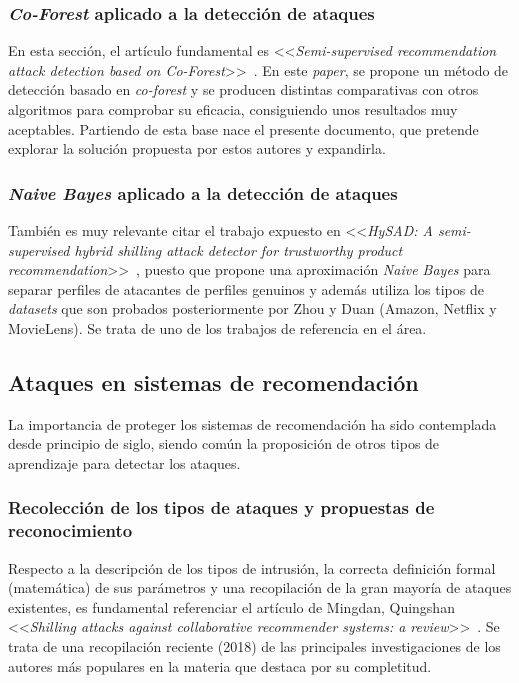 \subsubsection{\textit{Co-Forest} aplicado a la detección de ataques~\cite{zhou2021SemisupervisedRecommendationAttack}}
En esta sección, el artículo fundamental es <<\textit{Semi-supervised recommendation attack detection based on Co-Forest}>>~\cite{zhou2021SemisupervisedRecommendationAttack}. En este \textit{paper}, se propone un método de detección basado en \textit{co-forest} y se producen distintas comparativas con otros algoritmos para comprobar su eficacia, consiguiendo unos resultados muy aceptables. Partiendo de esta base nace el presente documento, que pretende explorar la solución propuesta por estos autores y expandirla.

\subsubsection{\textit{Naive Bayes} aplicado a la detección de ataques~\cite{zhiang2012HySADNayveBayes}}
También es muy relevante citar el trabajo expuesto en <<\textit{HySAD: A semi-supervised hybrid shilling attack detector for trustworthy product recommendation}>>~\cite{zhiang2012HySADNayveBayes}, puesto que propone una aproximación \textit{Naive Bayes} para separar perfiles de atacantes de perfiles genuinos y además utiliza los tipos de \textit{datasets} que son probados posteriormente por Zhou y Duan (Amazon, Netflix y MovieLens). Se trata de uno de los trabajos de referencia en el área.

\subsection{Ataques en sistemas de recomendación}

La importancia de proteger los sistemas de recomendación ha sido contemplada desde principio de siglo, siendo común la proposición de otros tipos de aprendizaje para detectar los ataques.

\subsubsection{Recolección de los tipos de ataques y propuestas de reconocimiento~\cite{mingdan2018ShillingAttacksAReview}}
Respecto a la descripción de los tipos de intrusión, la correcta definición formal (matemática) de sus parámetros y una recopilación de la gran mayoría de ataques existentes, es fundamental referenciar el artículo de Mingdan, Quingshan <<\textit{Shilling attacks against collaborative recommender systems: a review}>>~\cite{mingdan2018ShillingAttacksAReview}. Se trata de una recopilación reciente (2018) de las principales investigaciones de los autores más populares en la materia que destaca por su completitud.

